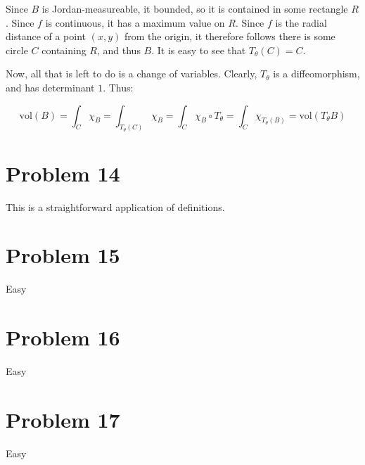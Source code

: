 \documentclass[10pt, oneside]{amsart}
\begin{document}
    Since $B$ is Jordan-measureable, it bounded, so it is contained in some rectangle $R$. Since $f$ is continuous, it has a maximum value on $R$. Since $f$ is the radial distance of a point $(x, y)$ from the
    origin, it therefore follows there is some circle $C$ containing $R$, and thus $B$. It is easy to see that $T_{\theta}(C) = C$.
    \newline

    Now, all that is left to do is a change of variables. Clearly, $T_{\theta}$ is a diffeomorphism, and has determinant $1$. Thus:

    $$\text{vol}(B) = \displaystyle\int_{C} \chi_{B} = \displaystyle\int_{T_{\theta}(C)} \chi_{B} = \displaystyle\int_{C} \chi_B \circ T_{\theta} = \displaystyle\int_{C} \chi_{T_{\theta}(B)} = \text{vol}(T_{\theta} B)$$

    \hrulefill

    \section{Problem 14}

    This is a straightforward application of definitions.

    \hrulefill

    \section{Problem 15}

    Easy

    \hrulefill

    \section{Problem 16}

    Easy

    \hrulefill

    \section{Problem 17}

    Easy

    \hrulefill

    
\end{document}
